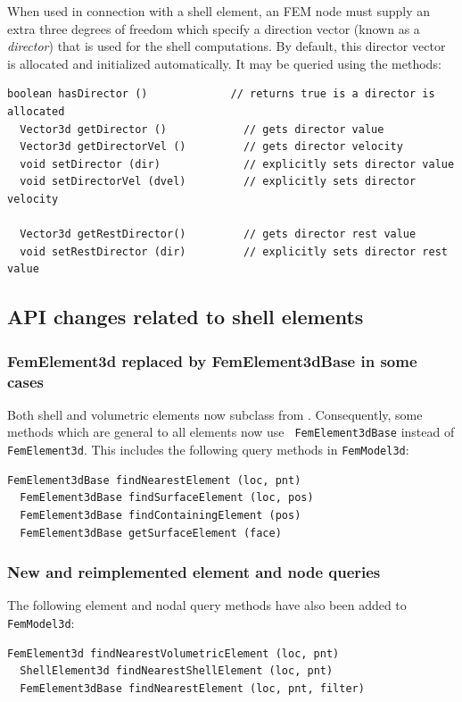 \documentclass{article}
\begin{document}
When used in connection with a shell element, an FEM node must supply
an extra three degrees of freedom which specify a direction vector
(known as a {\it director}) that is used for the shell
computations. By default, this director vector is allocated and
initialized automatically. It may be queried using the methods:
%
\begin{lstlisting}[]
  boolean hasDirector ()             // returns true is a director is allocated
  Vector3d getDirector ()            // gets director value
  Vector3d getDirectorVel ()         // gets director velocity
  void setDirector (dir)             // explicitly sets director value
  void setDirectorVel (dvel)         // explicitly sets director velocity

  Vector3d getRestDirector()         // gets director rest value
  void setRestDirector (dir)         // explicitly sets director rest value
\end{lstlisting}
%

\subsection*{API changes related to shell elements}

\subsubsection*{FemElement3d replaced by FemElement3dBase in some cases}

Both shell and volumetric elements now subclass from
. Consequently,
some methods which are general to all elements now use {\tt
FemElement3dBase} instead of {\tt FemElement3d}. This includes
the following query methods in {\tt FemModel3d}:
%
\begin{lstlisting}[]
  FemElement3dBase findNearestElement (loc, pnt) 
  FemElement3dBase findSurfaceElement (loc, pos) 
  FemElement3dBase findContainingElement (pos) 
  FemElement3dBase getSurfaceElement (face) 
\end{lstlisting}
%

\subsubsection*{New and reimplemented element and node queries}

The following element and nodal query methods have also been added to
{\tt FemModel3d}:
%
\begin{lstlisting}[]
  FemElement3d findNearestVolumetricElement (loc, pnt) 
  ShellElement3d findNearestShellElement (loc, pnt) 
  FemElement3dBase findNearestElement (loc, pnt, filter) 
\end{lstlisting}
%
\end{document}

